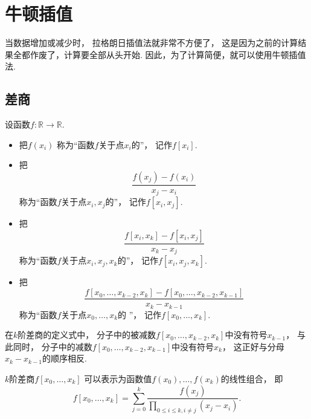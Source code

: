 \section{牛顿插值}
当数据增加或减少时，
拉格朗日插值法就非常不方便了，
这是因为之前的计算结果全都作废了，计算要全部从头开始.
因此，为了计算简便，就可以使用牛顿插值法.

\subsection{差商}
\begin{definition}
设函数\(f\colon \mathbb{R} \to \mathbb{R}\).
\begin{itemize}
	\item 把\(f(x_i)\)
	称为“函数\(f\)关于点\(x_i\)的”，
	记作\(f[x_i]\).

	\item 把\begin{equation*}
		\frac{f(x_j) - f(x_i)}{x_j - x_i}
	\end{equation*}
	称为“函数\(f\)关于点\(x_i,x_j\)的”，
	记作\(f[x_i,x_j]\).

	\item 把\begin{equation*}
		\frac{f[x_i,x_k] - f[x_i,x_j]}{x_k - x_j}
	\end{equation*}
	称为“函数\(f\)关于点\(x_i,x_j,x_k\)的”，
	记作\(f[x_i,x_j,x_k]\).

	\item 把\begin{equation*}
		\frac{f[x_0,\dotsc,x_{k-2},x_k] - f[x_0,\dotsc,x_{k-2},x_{k-1}]}{x_k - x_{k-1}}
	\end{equation*}
	称为“函数\(f\)关于点\(x_0,\dotsc,x_k\)的 ”，
	记作\(f[x_0,\dotsc,x_k]\).
\end{itemize}
\end{definition}
\begin{remark}
在\(k\)阶差商的定义式中，
分子中的被减数\(f[x_0,\dotsc,x_{k-2},x_k]\)中没有符号\(x_{k-1}\)，
与此同时，
分子中的减数\(f[x_0,\dotsc,x_{k-2},x_{k-1}]\)中没有符号\(x_k\)，
这正好与分母\(x_k - x_{k-1}\)的顺序相反.
\end{remark}

\begin{property}
\(k\)阶差商\(f[x_0,\dotsc,x_k]\)
可以表示为函数值\(f(x_0),\dotsc,f(x_k)\)的线性组合，
即\begin{equation}
	f[x_0,\dotsc,x_k]
	= \sum_{j=0}^k
	\frac{f(x_j)}{
		\prod_{0 \leq i \leq k, i \neq j}
		(x_j - x_i)
	}.
\end{equation}
\end{property}

